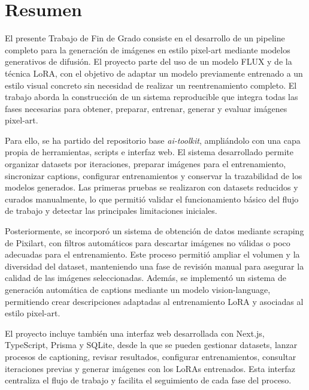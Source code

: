 \documentclass[a4paper,11pt,titlepage]{scrbook}
\begin{document}
\renewcommand{\listtablename}{Índice de tablas} %
\renewcommand{\tablename}{Tabla}
\renewcommand{\lstlistingname}{Listado}
\renewcommand{\lstlistlistingname}{Índice de \lstlistingname s}

\frontmatter

\chapter{Resumen}
El presente Trabajo de Fin de Grado consiste en el desarrollo de un pipeline completo para la generación de imágenes en estilo pixel-art mediante modelos generativos de difusión. El proyecto parte del uso de un modelo FLUX y de la técnica LoRA, con el objetivo de adaptar un modelo previamente entrenado a un estilo visual concreto sin necesidad de realizar un reentrenamiento completo. El trabajo aborda la construcción de un sistema reproducible que integra todas las fases necesarias para obtener, preparar, entrenar, generar y evaluar imágenes pixel-art.

\medskip

Para ello, se ha partido del repositorio base \textit{ai-toolkit}, ampliándolo con una capa propia de herramientas, scripts e interfaz web. El sistema desarrollado permite organizar datasets por iteraciones, preparar imágenes para el entrenamiento, sincronizar captions, configurar entrenamientos y conservar la trazabilidad de los modelos generados. Las primeras pruebas se realizaron con datasets reducidos y curados manualmente, lo que permitió validar el funcionamiento básico del flujo de trabajo y detectar las principales limitaciones iniciales.

\medskip

Posteriormente, se incorporó un sistema de obtención de datos mediante scraping de Pixilart, con filtros automáticos para descartar imágenes no válidas o poco adecuadas para el entrenamiento. Este proceso permitió ampliar el volumen y la diversidad del dataset, manteniendo una fase de revisión manual para asegurar la calidad de las imágenes seleccionadas. Además, se implementó un sistema de generación automática de captions mediante un modelo vision-language, permitiendo crear descripciones adaptadas al entrenamiento LoRA y asociadas al estilo pixel-art.

\medskip

El proyecto incluye también una interfaz web desarrollada con Next.js, TypeScript, Prisma y SQLite, desde la que se pueden gestionar datasets, lanzar procesos de captioning, revisar resultados, configurar entrenamientos, consultar iteraciones previas y generar imágenes con los LoRAs entrenados. Esta interfaz centraliza el flujo de trabajo y facilita el seguimiento de cada fase del proceso.
\end{document}
